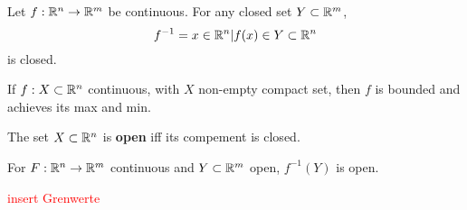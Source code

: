\begin{proposition}
	Let $f: \mathbb{R}^n \to \mathbb{R}^m$ be continuous.
	For any closed set $Y \subset \mathbb{R}^m$, $$f^{-1} = {x\in \mathbb{R}^n | f(x) \in Y} \subset \mathbb{R}^n$$ is closed.
\end{proposition}

\begin{theorem}
	If $f: X \subset \mathbb{R}^n$ continuous, with $X$ non-empty compact set, then $f$ is bounded and achieves its max and min.
\end{theorem}

\begin{proposition}
	The set $X \subset \mathbb{R}^n$ is \textbf{open} iff its compement is closed.
\end{proposition}

\begin{corollary}
	For $F: \mathbb{R}^n \to \mathbb{R}^m$ continuous and $Y \subset \mathbb{R}^m$ open, $f^{-1}(Y)$ is open.
\end{corollary}

\begin{remark}
    \textcolor{red}{insert Grenwerte}
\end{remark}
